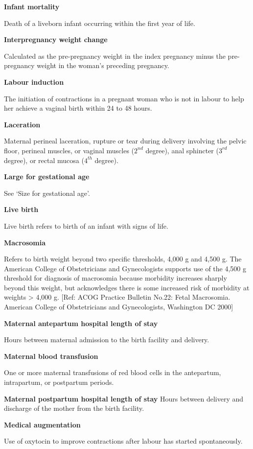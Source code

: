 \documentclass[
]{krantz}
\begin{document}
\textbf{Infant mortality}

Death of a liveborn infant occurring within the first year of life.

\textbf{Interpregnancy weight change}

Calculated as the pre-pregnancy weight in the index pregnancy minus the pre-pregnancy weight in the woman's preceding pregnancy.

\textbf{Labour induction}

The initiation of contractions in a pregnant woman who is not in labour to help her achieve a vaginal birth within 24 to 48 hours.

\textbf{Laceration}

Maternal perineal laceration, rupture or tear during delivery involving the pelvic floor, perineal muscles, or vaginal muscles (\(2^{nd}\) degree), anal sphincter (\(3^{rd}\) degree), or rectal mucosa (\(4^{th}\) degree).

\textbf{Large for gestational age}

See `Size for gestational age'.

\textbf{Live birth}

Live birth refers to birth of an infant with signs of life.

\textbf{Macrosomia}

Refers to birth weight beyond two specific thresholds, 4,000 g and 4,500 g. The American College of Obstetricians and Gynecologists supports use of the 4,500 g threshold for diagnosis of macrosomia because morbidity increases sharply beyond this weight, but acknowledges there is some increased risk of morbidity at weights \textgreater{} 4,000 g. {[}Ref: ACOG Practice Bulletin No.22: Fetal Macrosomia. American College of Obstetricians and Gynecologists, Washington DC 2000{]}

\textbf{Maternal antepartum hospital length of stay}

Hours between maternal admission to the birth facility and delivery.

\textbf{Maternal blood transfusion}

One or more maternal transfusions of red blood cells in the antepartum, intrapartum, or postpartum periods.

\textbf{Maternal postpartum hospital length of stay}
Hours between delivery and discharge of the mother from the birth facility.

\textbf{Medical augmentation}

Use of oxytocin to improve contractions after labour has started spontaneously.
\end{document}
